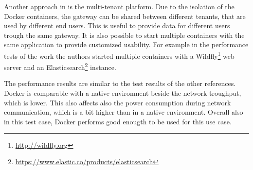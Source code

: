 Another approach in \autocite{Morabito:2016} is the multi-tenant platform.
Due to the isolation of the Docker containers, the gateway can be shared between different tenants, that are used by different end users.\autocite[cf.][p. 2]{Morabito:2016}
This is useful to provide data for different users trough the same gateway.
It is also possible to start multiple containers with the same application to provide customized usability.
For example in the performance tests of the work the authors started multiple containers with a Wildfly\footnote{\url{http://wildfly.org}} web server and an Elasticsearch\footnote{\url{https://www.elastic.co/products/elasticsearch}} instance.\autocite[cf.][p. 2]{Morabito:2016}

The performance results are similar to the test results of the other references.
Docker is comparable with a native environment beside the network troughput, which is lower.\autocite[cf.][p. 4]{Morabito:2016}
This also affects also the power consumption during network communication, which is a bit higher than in a native environment.\autocite[cf.][p. 4]{Morabito:2016}
Overall also in this test case, Docker performs good enougth to be used for this use case.\autocite[cf.][p. 4]{Morabito:2016}
